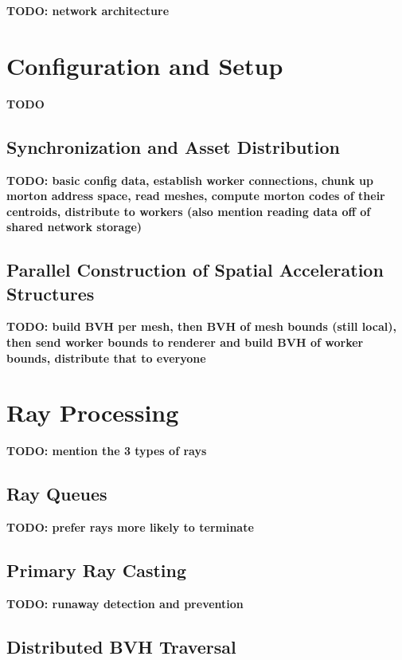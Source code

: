 \documentclass[12pt]{ucthesis}
\begin{document}
\textbf{TODO: network architecture}

\section{Configuration and Setup}
\label{config}

\textbf{TODO}

\subsection{Synchronization and Asset Distribution}
\label{config}

\textbf{TODO: basic config data, establish worker connections, chunk up morton address space, read meshes, compute morton codes of their centroids, distribute to workers (also mention reading data off of shared network storage)}

\subsection{Parallel Construction of Spatial Acceleration Structures}
\label{parallbvh}

\textbf{TODO: build BVH per mesh, then BVH of mesh bounds (still local), then send worker bounds to renderer and build BVH of worker bounds, distribute that to everyone}

\section{Ray Processing}
\label{process}

\textbf{TODO: mention the 3 types of rays}

\subsection {Ray Queues}
\label{queues}

\textbf{TODO: prefer rays more likely to terminate}

\subsection{Primary Ray Casting}
\label{primaryrays}

\textbf{TODO: runaway detection and prevention}

\subsection{Distributed BVH Traversal}
\label{traversal}
\end{document}
